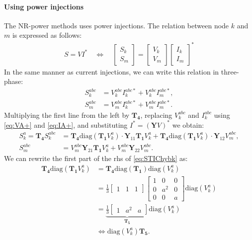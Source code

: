 \documentclass[10pt,journal]{article}
\begin{document}
\paragraph{Using power injections}
The NR-power methods uses power injections. The relation between node $k$ and $m$ is expressed as follows: 
\begin{align}
   {S}={V}{I^*}\quad\Leftrightarrow\quad\begin{bmatrix}
     S_{k} \\
     S_m
    \end{bmatrix} = \begin{bmatrix}
     V_k \\
     V_m
    \end{bmatrix}\begin{bmatrix}
    I_k \\
     I_m
    \end{bmatrix}^*
    \end{align}
In the same manner as current injections, we can write this relation in three-phase: 
\begin{align}
   {S}_k^{abc}&={V}_k^{abc}{I}_k^{abc*}+{V}_k^{abc}{I}_m^{abc*},\label{eq:SkYV}\\
   {S}_m^{abc}&={V}_m^{abc}{I}_k^{abc*}+{V}_m^{abc}{I}_m^{abc*}.\label{eq:SmYV}
\end{align}
Multiplying the first line from the left by $\mathbf{T_4}$, replacing $V_k^{abc}$ and $I_k^{abc}$ using \eqref{eq:VA+} and \eqref{eq:IA+}, and substituting $I^* = (\mathbf{Y}V)^*$ we obtain:
\begin{align}
    S_k^a = \mathbf{T_4} S^{abc}_k &= \mathbf{T_4}\mbox{diag}(\mathbf{T_1}V_k^a)\cdot \mathbf{Y}_{11}\mathbf{T_1}V_k^a + \mathbf{T_4}\mbox{diag}(\mathbf{T_1}V_k^a)\cdot \mathbf{Y}_{12}V_m^{abc}, \label{eq:STIChybk}\\ 
        S^{abc}_m &=V_m^{abc} \mathbf{Y}_{21}\mathbf{T_1}V_k^a + V_m^{abc} \mathbf{Y}_{22}V_m^{abc}. \label{eq:STIChybm}
\end{align}
We can rewrite the first part of the rhs of \eqref{eq:STIChybk} as:
\begin{align}
    \mathbf{T_4}\mbox{diag}(\mathbf{T_1}V_k^a) &= \mathbf{T_4}\mbox{diag}(\mathbf{T_1})\mbox{diag}(V_k^a) \\
    &= \frac{1}{3}\begin{bmatrix} 1 & 1 & 1 \end{bmatrix}\begin{bmatrix} 1 &0 &0 \\ 
   0 & a^2 &0 \\ 
    0& 0& a \end{bmatrix}\mbox{diag}(V_k^a) \\
    &=\underbrace{\frac{1}{3} \begin{bmatrix}1 & a^2 & a \end{bmatrix}}_{\mathbf{T_5}}\mbox{diag}(V_k^a) \\
    &\Leftrightarrow \mbox{diag}(V_k^a) \mathbf{T_5}.\label{eq:VkT6}
\end{align}
\end{document}
